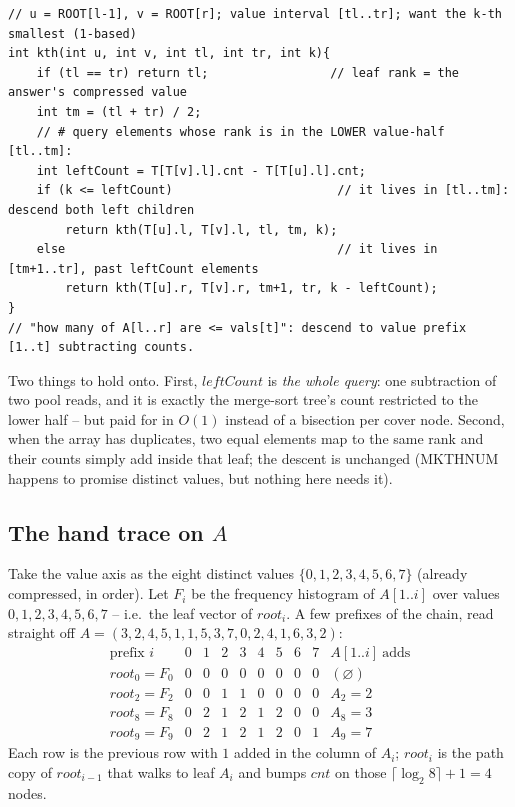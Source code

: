 \begin{lstlisting}[caption={k-th smallest of A(l..r) by descending ROOT(l-1) and ROOT(r) together -- the left-count DIFFERENCE decides each fork; O(log V)}, label={lst:c19-kth}]
// u = ROOT[l-1], v = ROOT[r]; value interval [tl..tr]; want the k-th smallest (1-based)
int kth(int u, int v, int tl, int tr, int k){
    if (tl == tr) return tl;                 // leaf rank = the answer's compressed value
    int tm = (tl + tr) / 2;
    // # query elements whose rank is in the LOWER value-half [tl..tm]:
    int leftCount = T[T[v].l].cnt - T[T[u].l].cnt;
    if (k <= leftCount)                       // it lives in [tl..tm]: descend both left children
        return kth(T[u].l, T[v].l, tl, tm, k);
    else                                      // it lives in [tm+1..tr], past leftCount elements
        return kth(T[u].r, T[v].r, tm+1, tr, k - leftCount);
}
// "how many of A[l..r] are <= vals[t]": descend to value prefix [1..t] subtracting counts.
\end{lstlisting}

Two things to hold onto. First, \(\mathit{leftCount}\) is \emph{the whole query}: one subtraction of two pool reads, and it is exactly the merge-sort tree's count restricted to the lower half -- but paid for in \(O(1)\) instead of a bisection per cover node. Second, when the array has duplicates, two equal elements map to the same rank and their counts simply add inside that leaf; the descent is unchanged (MKTHNUM happens to promise distinct values, but nothing here needs it).

\subsection{The hand trace on \(A\)}

Take the value axis as the eight distinct values \(\{0,1,2,3,4,5,6,7\}\) (already compressed, in order). Let \(F_i\) be the frequency histogram of \(A[1..i]\) over values \(0,1,2,3,4,5,6,7\) -- i.e.\ the leaf vector of \(\mathit{root}_i\). A few prefixes of the chain, read straight off \(A=(3,2,4,5,1,1,5,3,7,0,2,4,1,6,3,2)\):
\[
\begin{array}{c|cccccccc|c}
\text{prefix } i & 0&1&2&3&4&5&6&7 & A[1..i]\ \text{adds}\\\hline
\mathit{root}_0=F_0 & 0&0&0&0&0&0&0&0 & (\varnothing)\\
\mathit{root}_2=F_2 & 0&0&1&1&0&0&0&0 & A_2=2\\
\mathit{root}_8=F_8 & 0&2&1&2&1&2&0&0 & A_8=3\\
\mathit{root}_9=F_9 & 0&2&1&2&1&2&0&1 & A_9=7
\end{array}
\]
Each row is the previous row with \(1\) added in the column of \(A_i\); \(\mathit{root}_i\) is the path copy of \(\mathit{root}_{i-1}\) that walks to leaf \(A_i\) and bumps \(\mathit{cnt}\) on those \(\lceil\log_2 8\rceil+1=4\) nodes.

